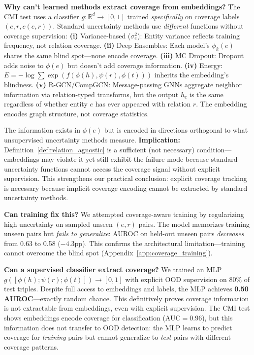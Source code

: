 \textbf{Why can't learned methods extract coverage from embeddings?} The CMI test uses a classifier $g: \mathbb{R}^d \to [0,1]$ trained \emph{specifically} on coverage labels $(e, r, c(e,r))$. Standard uncertainty methods use \emph{different} functions without coverage supervision:
\textbf{(i)} Variance-based ($\sigma^2_e$): Entity variance reflects training frequency, not relation coverage.
\textbf{(ii)} Deep Ensembles: Each model's $\phi_k(e)$ shares the same blind spot---none encode coverage.
\textbf{(iii)} MC Dropout: Dropout adds noise to $\phi(e)$ but doesn't add coverage information.
\textbf{(iv)} Energy: $E = -\log\sum\exp(f(\phi(h), \psi(r), \phi(t)))$ inherits the embedding's blindness.
\textbf{(v)} R-GCN/CompGCN: Message-passing GNNs aggregate neighbor information via relation-typed transforms, but the output $h_e$ is the same regardless of whether entity $e$ has ever appeared with relation $r$. The embedding encodes graph structure, not coverage statistics.

The information exists in $\phi(e)$ but is encoded in directions orthogonal to what unsupervised uncertainty methods measure. \textbf{Implication:} Definition~\ref{def:relation_agnostic} is a sufficient (not necessary) condition---embeddings may violate it yet still exhibit the failure mode because standard uncertainty functions cannot access the coverage signal without explicit supervision. This strengthens our practical conclusion: explicit coverage tracking is necessary because implicit coverage encoding cannot be extracted by standard uncertainty methods.

\textbf{Can training fix this?} We attempted coverage-aware training by regularizing high uncertainty on sampled unseen $(e,r)$ pairs. The model memorizes training unseen pairs but \emph{fails to generalize}: AUROC on held-out unseen pairs \emph{decreases} from 0.63 to 0.58 ($-$4.3pp). This confirms the architectural limitation---training cannot overcome the blind spot (Appendix~\ref{app:coverage_training}).

\textbf{Can a supervised classifier extract coverage?} We trained an MLP $g([\phi(h); \psi(r); \phi(t)]) \to [0,1]$ with explicit OOD supervision on 80\% of test triples. Despite full access to embeddings and labels, the MLP achieves \textbf{0.50 AUROC}---exactly random chance. This definitively proves coverage information is not extractable from embeddings, even with explicit supervision. The CMI test shows embeddings encode coverage for classification (AUC$=$0.96), but this information does not transfer to OOD detection: the MLP learns to predict coverage for \emph{training} pairs but cannot generalize to \emph{test} pairs with different coverage patterns.

